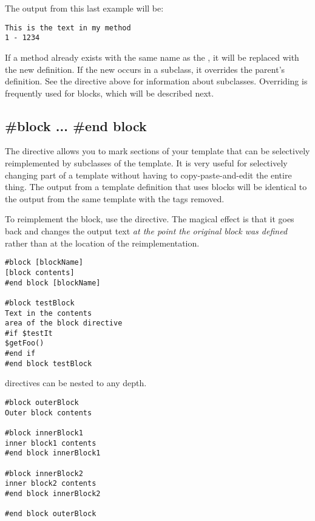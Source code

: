 The output from this last example will be:

\begin{verbatim}
This is the text in my method 
1 - 1234
\end{verbatim}

If a method already exists with the same name as the , it will be replaced
with the new definition.  If the new  occurs in a subclass, it overrides the
parent's definition.  See the  directive above for information about
subclasses.  Overriding is frequently used for blocks, which will be described next.


\subsection{\#block ... \#end block}
\label{inheritanceEtc.block}

The  directive allows you to mark sections of your template
that can be selectively reimplemented by subclasses of the template.  It is
very useful for selectively changing part of a template without having to
copy-paste-and-edit the entire thing.  The output from a template definition
that uses blocks will be identical to the output from the same template with
the  tags removed. 

To reimplement the block, use the  directive.  The magical effect is that it
goes back and changes the output text {\em at the point the original block was
defined} rather than at the location of the reimplementation.

\begin{verbatim}
#block [blockName] 
[block contents] 
#end block [blockName]

#block testBlock
Text in the contents 
area of the block directive
#if $testIt
$getFoo() 
#end if
#end block testBlock
\end{verbatim}

 directives can be nested to any depth.

\begin{verbatim}
#block outerBlock
Outer block contents 

#block innerBlock1
inner block1 contents 
#end block innerBlock1

#block innerBlock2
inner block2 contents 
#end block innerBlock2

#end block outerBlock
\end{verbatim}


